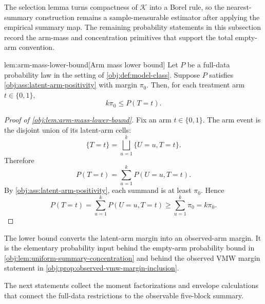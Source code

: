 \documentclass[11pt]{article}
\begin{document}
The selection lemma turns compactness of \(\mathcal K\) into a Borel rule, so the nearest-summary construction remains a sample-measurable estimator after applying the empirical summary map. The remaining probability statements in this subsection record the arm-mass and concentration primitives that support the total empty-arm convention.

\begin{lemmav}{lem:arm-mass-lower-bound}[Arm mass lower bound]
Let \(P\) be a full-data probability law in the setting of \cref{obj:def:model-class}. Suppose \(P\) satisfies \cref{obj:ass:latent-arm-positivity} with margin \(\pi_0\). Then, for each treatment arm \(t\in\{0,1\}\),
\[
k\pi_0 \le P(T=t).
\]
\end{lemmav}

\begin{proof}[Proof of \cref{obj:lem:arm-mass-lower-bound}]
Fix an arm \(t\in\{0,1\}\). The arm event is the disjoint union of its latent-arm cells:
\[
\{T=t\}=\bigsqcup_{u=1}^k \{U=u,T=t\}.
\]
Therefore
\[
P(T=t)=\sum_{u=1}^k P(U=u,T=t).
\] %
By \cref{obj:ass:latent-arm-positivity}, each summand is at least \(\pi_0\). Hence
\[
P(T=t)
=\sum_{u=1}^k P(U=u,T=t)
\ge \sum_{u=1}^k \pi_0
=k\pi_0 .
\] %
\end{proof}

The lower bound converts the latent-arm margin into an observed-arm margin. It is the elementary probability input behind the empty-arm probability bound in \cref{obj:lem:uniform-summary-concentration} and behind the observed VMW margin statement in \cref{obj:prop:observed-vmw-margin-inclusion}.

The next statements collect the moment factorizations and envelope calculations that connect the full-data restrictions to the observable five-block summary.
\end{document}
